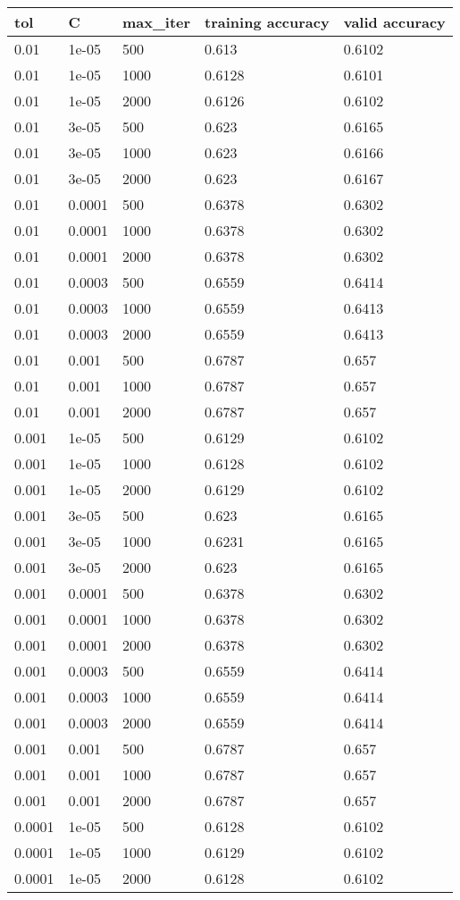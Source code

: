 \documentclass{article}%
\begin{document}
%
\normalsize%
\begin{longtable}{l l l l l}%
\hline%
tol&C&max\_iter&training accuracy&valid accuracy\\%
\hline%
\endhead%
\hline%
0.01&1e{-}05&500&0.613&0.6102\\%
0.01&1e{-}05&1000&0.6128&0.6101\\%
0.01&1e{-}05&2000&0.6126&0.6102\\%
0.01&3e{-}05&500&0.623&0.6165\\%
0.01&3e{-}05&1000&0.623&0.6166\\%
0.01&3e{-}05&2000&0.623&0.6167\\%
0.01&0.0001&500&0.6378&0.6302\\%
0.01&0.0001&1000&0.6378&0.6302\\%
0.01&0.0001&2000&0.6378&0.6302\\%
0.01&0.0003&500&0.6559&0.6414\\%
0.01&0.0003&1000&0.6559&0.6413\\%
0.01&0.0003&2000&0.6559&0.6413\\%
0.01&0.001&500&0.6787&0.657\\%
0.01&0.001&1000&0.6787&0.657\\%
0.01&0.001&2000&0.6787&0.657\\%
0.001&1e{-}05&500&0.6129&0.6102\\%
0.001&1e{-}05&1000&0.6128&0.6102\\%
0.001&1e{-}05&2000&0.6129&0.6102\\%
0.001&3e{-}05&500&0.623&0.6165\\%
0.001&3e{-}05&1000&0.6231&0.6165\\%
0.001&3e{-}05&2000&0.623&0.6165\\%
0.001&0.0001&500&0.6378&0.6302\\%
0.001&0.0001&1000&0.6378&0.6302\\%
0.001&0.0001&2000&0.6378&0.6302\\%
0.001&0.0003&500&0.6559&0.6414\\%
0.001&0.0003&1000&0.6559&0.6414\\%
0.001&0.0003&2000&0.6559&0.6414\\%
0.001&0.001&500&0.6787&0.657\\%
0.001&0.001&1000&0.6787&0.657\\%
0.001&0.001&2000&0.6787&0.657\\%
0.0001&1e{-}05&500&0.6128&0.6102\\%
0.0001&1e{-}05&1000&0.6129&0.6102\\%
0.0001&1e{-}05&2000&0.6128&0.6102\\%

\end{longtable}
\end{document}
